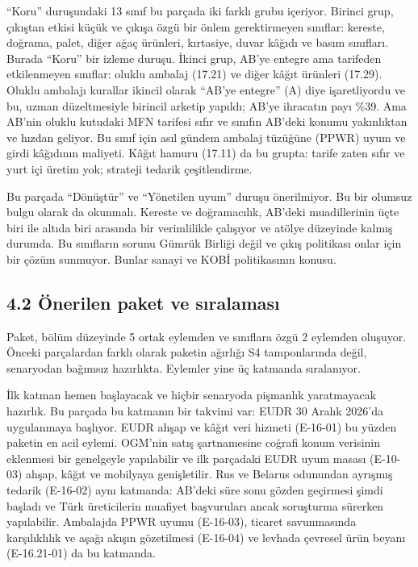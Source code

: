 ``Koru'' duruşundaki 13 sınıf bu parçada iki farklı grubu içeriyor. Birinci grup, çıkıştan etkisi küçük ve çıkışa özgü bir önlem gerektirmeyen sınıflar: kereste, doğrama, palet, diğer ağaç ürünleri, kırtasiye, duvar kâğıdı ve basım sınıfları. Burada ``Koru'' bir izleme duruşu. İkinci grup, AB'ye entegre ama tarifeden etkilenmeyen sınıflar: oluklu ambalaj (17.21) ve diğer kâğıt ürünleri (17.29). Oluklu ambalajı kurallar ikincil olarak ``AB'ye entegre'' (A) diye işaretliyordu ve bu, uzman düzeltmesiyle birincil arketip yapıldı; AB'ye ihracatın payı \%39. Ama AB'nin oluklu kutudaki MFN tarifesi sıfır ve sınıfın AB'deki konumu yakınlıktan ve hızdan geliyor. Bu sınıf için asıl gündem ambalaj tüzüğüne (PPWR) uyum ve girdi kâğıdının maliyeti. Kâğıt hamuru (17.11) da bu grupta: tarife zaten sıfır ve yurt içi üretim yok; strateji tedarik çeşitlendirme.

Bu parçada ``Dönüştür'' ve ``Yönetilen uyum'' duruşu önerilmiyor. Bu bir olumsuz bulgu olarak da okunmalı. Kereste ve doğramacılık, AB'deki muadillerinin üçte biri ile altıda biri arasında bir verimlilikle çalışıyor ve atölye düzeyinde kalmış durumda. Bu sınıfların sorunu Gümrük Birliği değil ve çıkış politikası onlar için bir çözüm sunmuyor. Bunlar sanayi ve KOBİ politikasının konusu.

\hypertarget{nace_kartlar_16-18-42-uxf6nerilen-paket-ve-sux131ralamasux131}{%
\subsection{4.2 Önerilen paket ve sıralaması}\label{nace_kartlar_16-18-42-uxf6nerilen-paket-ve-sux131ralamasux131}}

Paket, bölüm düzeyinde 5 ortak eylemden ve sınıflara özgü 2 eylemden oluşuyor. Önceki parçalardan farklı olarak paketin ağırlığı S4 tamponlarında değil, senaryodan bağımsız hazırlıkta. Eylemler yine üç katmanda sıralanıyor.

İlk katman hemen başlayacak ve hiçbir senaryoda pişmanlık yaratmayacak hazırlık. Bu parçada bu katmanın bir takvimi var: EUDR 30 Aralık 2026'da uygulanmaya başlıyor. EUDR ahşap ve kâğıt veri hizmeti (E-16-01) bu yüzden paketin en acil eylemi. OGM'nin satış şartnamesine coğrafi konum verisinin eklenmesi bir genelgeyle yapılabilir ve ilk parçadaki EUDR uyum masası (E-10-03) ahşap, kâğıt ve mobilyaya genişletilir. Rus ve Belarus odunundan ayrışmış tedarik (E-16-02) aynı katmanda: AB'deki süre sonu gözden geçirmesi şimdi başladı ve Türk üreticilerin muafiyet başvuruları ancak soruşturma sürerken yapılabilir. Ambalajda PPWR uyumu (E-16-03), ticaret savunmasında karşılıklılık ve aşağı akışın gözetilmesi (E-16-04) ve levhada çevresel ürün beyanı (E-16.21-01) da bu katmanda.

